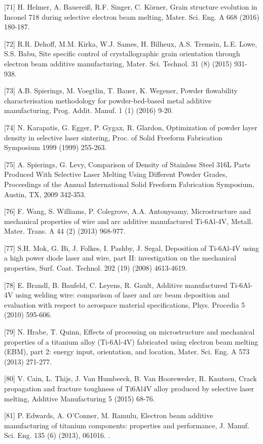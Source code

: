 \documentclass[10pt]{article}
\begin{document}
[71] H. Helmer, A. Bauereiß, R.F. Singer, C. Körner, Grain structure evolution in Inconel 718 during selective electron beam melting, Mater. Sci. Eng. A 668 (2016) 180-187.

[72] R.R. Dehoff, M.M. Kirka, W.J. Sames, H. Bilheux, A.S. Tremsin, L.E. Lowe, S.S. Babu, Site specific control of crystallographic grain orientation through electron beam additive manufacturing, Mater. Sci. Technol. 31 (8) (2015) 931-938.

[73] A.B. Spierings, M. Voegtlin, T. Bauer, K. Wegener, Powder flowability characterisation methodology for powder-bed-based metal additive manufacturing, Prog. Addit. Manuf. 1 (1) (2016) 9-20.

[74] N. Karapatis, G. Egger, P. Gygax, R. Glardon, Optimization of powder layer density in selective laser sintering, Proc. of Solid Freeform Fabrication Symposium 1999 (1999) 255-263.

[75] A. Spierings, G. Levy, Comparison of Density of Stainless Steel 316L Parts Produced With Selective Laser Melting Using Different Powder Grades, Proceedings of the Annual International Solid Freeform Fabrication Symposium, Austin, TX, 2009 342-353.

[76] F. Wang, S. Williams, P. Colegrove, A.A. Antonysamy, Microstructure and mechanical properties of wire and arc additive manufactured Ti-6Al-4V, Metall. Mater. Trans. A 44 (2) (2013) 968-977.

[77] S.H. Mok, G. Bi, J. Folkes, I. Pashby, J. Segal, Deposition of Ti-6Al-4V using a high power diode laser and wire, part II: investigation on the mechanical properties, Surf. Coat. Technol. 202 (19) (2008) 4613-4619.

[78] E. Brandl, B. Baufeld, C. Leyens, R. Gault, Additive manufactured Ti-6Al-4V using welding wire: comparison of laser and arc beam deposition and evaluation with respect to aerospace material specifications, Phys. Procedia 5 (2010) 595-606.

[79] N. Hrabe, T. Quinn, Effects of processing on microstructure and mechanical properties of a titanium alloy (Ti-6Al-4V) fabricated using electron beam melting (EBM), part 2: energy input, orientation, and location, Mater. Sci. Eng. A 573 (2013) 271-277.

[80] V. Cain, L. Thijs, J. Van Humbeeck, B. Van Hooreweder, R. Knutsen, Crack propagation and fracture toughness of Ti6Al4V alloy produced by selective laser melting, Additive Manufacturing 5 (2015) 68-76.

[81] P. Edwards, A. O'Conner, M. Ramulu, Electron beam additive manufacturing of titanium components: properties and performance, J. Manuf. Sci. Eng. 135 (6) (2013), 061016. .
\end{document}
